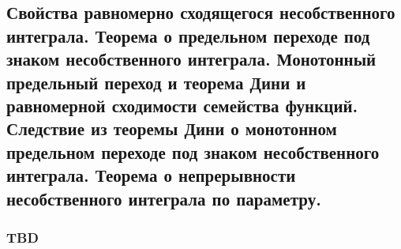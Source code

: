 \subsection{Свойства равномерно сходящегося несобственного интеграла. Теорема о предельном переходе под знаком несобственного интеграла. Монотонный предельный переход и теорема Дини и равномерной сходимости семейства функций. Следствие из теоремы Дини о монотонном предельном переходе под знаком несобственного интеграла. Теорема о непрерывности несобственного интеграла по параметру.}

\subsubsection{TBD}